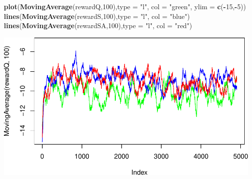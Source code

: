 \documentclass[
]{article}
\newenvironment{Shaded}{\begin{snugshade}}{\end{snugshade}}
\newcommand{\AttributeTok}[1]{\textcolor[rgb]{0.13,0.29,0.53}{#1}}
\newcommand{\DecValTok}[1]{\textcolor[rgb]{0.00,0.00,0.81}{#1}}
\newcommand{\FunctionTok}[1]{\textcolor[rgb]{0.13,0.29,0.53}{\textbf{#1}}}
\newcommand{\NormalTok}[1]{#1}
\newcommand{\SpecialCharTok}[1]{\textcolor[rgb]{0.81,0.36,0.00}{\textbf{#1}}}
\newcommand{\StringTok}[1]{\textcolor[rgb]{0.31,0.60,0.02}{#1}}
\begin{document}
\begin{Shaded}
\begin{Highlighting}[]
\FunctionTok{plot}\NormalTok{(}\FunctionTok{MovingAverage}\NormalTok{(rewardQ,}\DecValTok{100}\NormalTok{),}\AttributeTok{type =} \StringTok{"l"}\NormalTok{, }\AttributeTok{col =} \StringTok{"green"}\NormalTok{, }\AttributeTok{ylim =} \FunctionTok{c}\NormalTok{(}\SpecialCharTok{{-}}\DecValTok{15}\NormalTok{,}\SpecialCharTok{{-}}\DecValTok{5}\NormalTok{))}
\FunctionTok{lines}\NormalTok{(}\FunctionTok{MovingAverage}\NormalTok{(rewardS,}\DecValTok{100}\NormalTok{),}\AttributeTok{type =} \StringTok{"l"}\NormalTok{, }\AttributeTok{col =} \StringTok{"blue"}\NormalTok{)}
\FunctionTok{lines}\NormalTok{(}\FunctionTok{MovingAverage}\NormalTok{(rewardSA,}\DecValTok{100}\NormalTok{),}\AttributeTok{type =} \StringTok{"l"}\NormalTok{, }\AttributeTok{col =} \StringTok{"red"}\NormalTok{)}
\end{Highlighting}
\end{Shaded}

\includegraphics{jan2021_files/figure-latex/unnamed-chunk-3-4.pdf}
\end{document}
